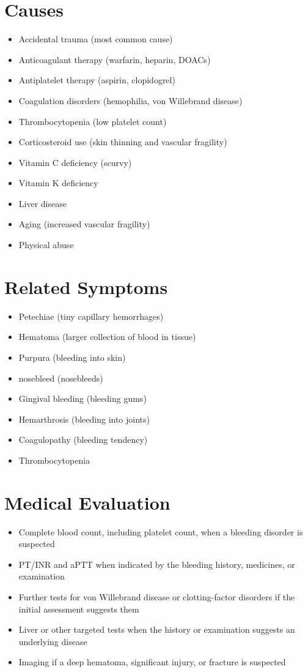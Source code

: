 \section*{Causes}
\begin{itemize}
\item Accidental trauma (most common cause)
\item Anticoagulant therapy (warfarin, heparin, DOACs)
\item Antiplatelet therapy (aspirin, clopidogrel)
\item Coagulation disorders (hemophilia, von Willebrand disease)
\item Thrombocytopenia (low platelet count)
\item Corticosteroid use (skin thinning and vascular fragility)
\item Vitamin C deficiency (scurvy)
\item Vitamin K deficiency
\item Liver disease
\item Aging (increased vascular fragility)
\item Physical abuse
\end{itemize}

\section*{Related Symptoms}
\begin{itemize}
\item Petechiae (tiny capillary hemorrhages)
\item Hematoma (larger collection of blood in tissue)
\item Purpura (bleeding into skin)
\item nosebleed (nosebleeds)
\item Gingival bleeding (bleeding gums)
\item Hemarthrosis (bleeding into joints)
\item Coagulopathy (bleeding tendency)
\item Thrombocytopenia
\end{itemize}

\section*{Medical Evaluation}
\begin{itemize}
 \item Complete blood count, including platelet count, when a bleeding disorder is suspected
 \item PT/INR and aPTT when indicated by the bleeding history, medicines, or examination
 \item Further tests for von Willebrand disease or clotting-factor disorders if the initial assessment suggests them
 \item Liver or other targeted tests when the history or examination suggests an underlying disease
 \item Imaging if a deep hematoma, significant injury, or fracture is suspected
\end{itemize}

